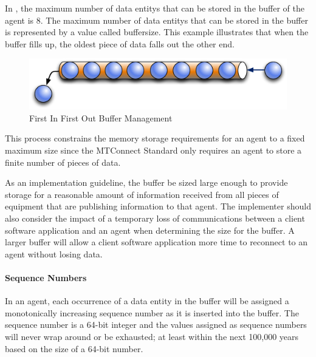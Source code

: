\FloatBarrier

In , the maximum number of \glspl{data entity} that can be stored in the \gls{buffer} of the \gls{agent} is 8.  The maximum number of \glspl{data entity} that can be stored in the \gls{buffer} is represented by a value called \gls{buffersize}.  This example illustrates that when the \gls{buffer} fills up, the oldest piece of data falls out the other end.

\begin{figure}[ht]
  \centering
  \includegraphics[width=1.0\textwidth]{figures/first-in-first-out-buffer-management.png}
  \caption{First In First Out Buffer Management}
  \label{fig:first-in-first-out-buffer-management}
\end{figure}

\FloatBarrier

This process constrains the memory storage requirements for an \gls{agent} to a fixed maximum size since the MTConnect Standard only requires an \gls{agent} to store a finite number of pieces of data.

As an implementation guideline, the \gls{buffer} \SHOULD be sized large enough to provide storage for a reasonable amount of information received from all pieces of equipment that are publishing information to that \gls{agent}.  The implementer should also consider the impact of a temporary loss of communications between a client software application and an \gls{agent} when determining the size for the \gls{buffer}.  A larger \gls{buffer} will allow a client software application more time to reconnect to an \gls{agent} without losing data.

\paragraph{Sequence Numbers}\mbox{}

In an \gls{agent}, each occurrence of a \gls{data entity} in the \gls{buffer} will be assigned a monotonically increasing \gls{sequence number} as it is inserted into the \gls{buffer}.  The \gls{sequence number} is a 64-bit integer and the values assigned as \glspl{sequence number} will never wrap around or be exhausted; at least within the next 100,000 years based on the size of a 64-bit number.

